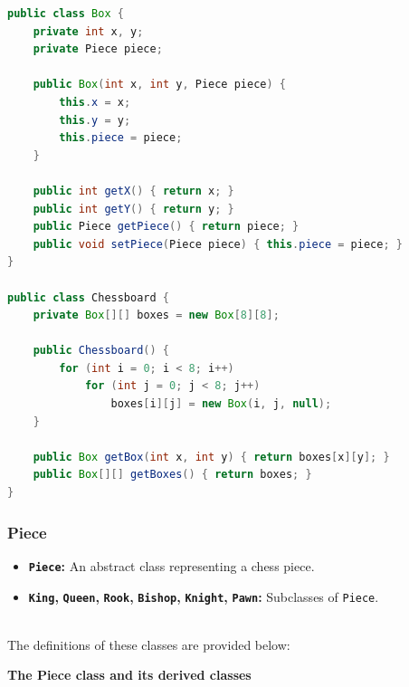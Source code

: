 \begin{lstlisting}[language=Java]
public class Box {
    private int x, y;
    private Piece piece;

    public Box(int x, int y, Piece piece) {
        this.x = x;
        this.y = y;
        this.piece = piece;
    }

    public int getX() { return x; }
    public int getY() { return y; }
    public Piece getPiece() { return piece; }
    public void setPiece(Piece piece) { this.piece = piece; }
}

public class Chessboard {
    private Box[][] boxes = new Box[8][8];

    public Chessboard() {
        for (int i = 0; i < 8; i++)
            for (int j = 0; j < 8; j++)
                boxes[i][j] = new Box(i, j, null);
    }

    public Box getBox(int x, int y) { return boxes[x][y]; }
    public Box[][] getBoxes() { return boxes; }
}
\end{lstlisting}

\subsubsection{Piece}\label{fo0QW0AP9F6kvtt05s4PP}

\begin{itemize}
\item
\protect{}\label{6IS5oP-HIq6Aow8hE6fMR}
\textbf{\texttt{Piece}:} An abstract class representing a chess piece.
\item
\protect{}\label{mdYEbc1fTOu9qkJ8EDRCt}
\textbf{\texttt{King},} \textbf{\texttt{Queen},} \textbf{\texttt{Rook},} \textbf{\texttt{Bishop},} \textbf{\texttt{Knight},} \textbf{\texttt{Pawn}:} Subclasses of \texttt{Piece}.
\end{itemize}
\\
The definitions of these classes are provided below:

\textbf{The Piece class and its derived classes}

